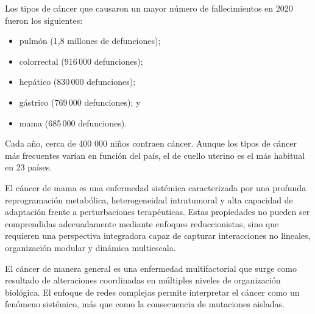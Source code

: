 \documentclass[12pt,spanish]{article}
\begin{document}
	Los tipos de cáncer que causaron un mayor número de fallecimientos en 2020 fueron los siguientes:
	
	\begin{itemize}
		\item pulmón (1,8 millones de defunciones);
		\item colorrectal (916\,000 defunciones);
		\item hepático (830\,000 defunciones);
		\item gástrico (769\,000 defunciones); y
		\item mama (685\,000 defunciones).
	\end{itemize}
	
	
	Cada año, cerca de 400 000 niños contraen cáncer. Aunque los tipos de cáncer más frecuentes varían en función del país, el de cuello uterino es el más habitual en 23 países. 
	
	El cáncer de mama es una enfermedad sistémica caracterizada por una profunda reprogramación metabólica, heterogeneidad intratumoral y alta capacidad de adaptación frente a perturbaciones terapéuticas. Estas propiedades no pueden ser comprendidas adecuadamente mediante enfoques reduccionistas, sino que requieren una perspectiva integradora capaz de capturar interacciones no lineales, organización modular y dinámica multiescala.
	
	El cáncer de manera general es una enfermedad multifactorial que surge como resultado de alteraciones coordinadas en múltiples niveles de organización biológica. El enfoque de redes complejas permite interpretar el cáncer como un fenómeno sistémico, más que como la consecuencia de mutaciones aisladas.
	
\end{document}
